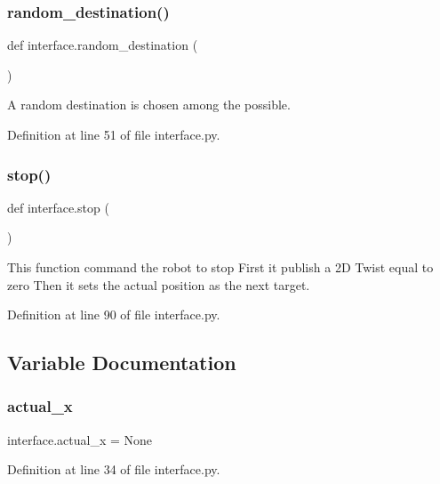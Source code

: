 \subsubsection{\texorpdfstring{random\+\_\+destination()}{random\_destination()}}
{\footnotesize\ttfamily def interface.\+random\+\_\+destination (\begin{DoxyParamCaption}{ }\end{DoxyParamCaption})}



A random destination is chosen among the possible. 



Definition at line 51 of file interface.\+py.

\mbox{\label{namespaceinterface_a106ba8bd4a2bb1c8c1b073afb74cdfdd}} 
\subsubsection{\texorpdfstring{stop()}{stop()}}
{\footnotesize\ttfamily def interface.\+stop (\begin{DoxyParamCaption}{ }\end{DoxyParamCaption})}



This function command the robot to stop First it publish a 2D Twist equal to zero Then it sets the actual position as the next target. 



Definition at line 90 of file interface.\+py.



\subsection{Variable Documentation}
\mbox{\label{namespaceinterface_a4fa46e1dde3c61a732b5383c93e411e1}} 
\subsubsection{\texorpdfstring{actual\+\_\+x}{actual\_x}}
{\footnotesize\ttfamily interface.\+actual\+\_\+x = None}



Definition at line 34 of file interface.\+py.

